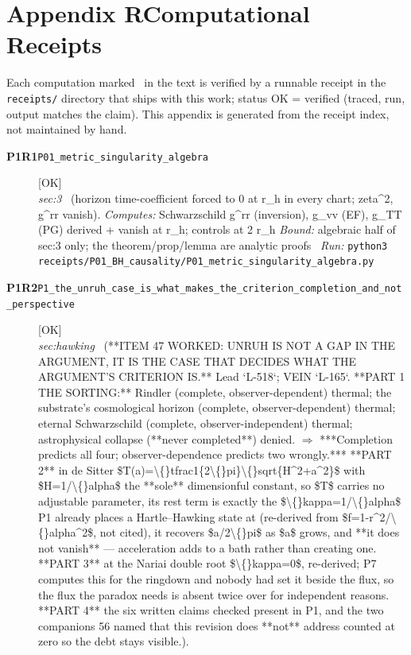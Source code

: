 \clearpage
\section*{Appendix R\quad Computational Receipts}\label{app:receipts}
\small\noindent Each computation marked \rcptmarker\ in the text is verified by a runnable receipt in the \texttt{receipts/} directory that ships with this work; status \textsf{OK} = verified (traced, run, output matches the claim). This appendix is generated from the receipt index, not maintained by hand.\par\medskip
\begingroup\renewcommand{\arraystretch}{1.25}
\begin{description}
\item[\textbf{P1R1}\quad\texttt{P01\_metric\_singularity\_algebra}]\hfill\textsf{[OK]}\\
\textit{sec:3} \ (horizon time-coefficient forced to 0 at r\_h in every chart; \textbar{}zeta\textbar{}\textasciicircum{}2, g\textasciicircum{}rr vanish). 
\emph{Computes:} Schwarzschild g\textasciicircum{}rr (inversion), g\_vv (EF), g\_TT (PG) derived + vanish at r\_h; controls at 2 r\_h
 \emph{Bound:} algebraic half of sec:3 only; the theorem/prop/lemma are analytic proofs
\ \emph{Run:} \texttt{python3 receipts/P01\_BH\_causality/P01\_metric\_singularity\_algebra.py}
\item[\textbf{P1R2}\quad\texttt{P1\_the\_unruh\_case\_is\_what\_makes\_the\_criterion\_completion\_and\_not\_perspective}]\hfill\textsf{[OK]}\\
\textit{sec:hawking} \ (**ITEM 47 WORKED: UNRUH IS NOT A GAP IN THE ARGUMENT, IT IS THE CASE THAT DECIDES WHAT THE ARGUMENT'S CRITERION IS.** Lead `L-518`; VEIN `L-165`. **PART 1 THE SORTING:** Rindler (complete, observer-dependent) thermal; the substrate's cosmological horizon (complete, observer-dependent) thermal; eternal Schwarzschild (complete, observer-independent) thermal; astrophysical collapse (**never completed**) denied. \ensuremath{\Rightarrow} ***Completion predicts all four; observer-dependence predicts two wrongly.*** **PART 2** in de Sitter \$T(a)=\textbackslash\{\}tfrac1\{2\textbackslash\{\}pi\}\textbackslash\{\}sqrt\{H\textasciicircum{}2+a\textasciicircum{}2\}\$ with \$H=1/\textbackslash\{\}alpha\$ the **sole** dimensionful constant, so \$T\$ carries no adjustable parameter, its rest term is exactly the \$\textbackslash\{\}kappa=1/\textbackslash\{\}alpha\$ P1 already places a Hartle--Hawking state at (re-derived from \$f=1-r\textasciicircum{}2/\textbackslash\{\}alpha\textasciicircum{}2\$, not cited), it recovers \$a/2\textbackslash\{\}pi\$ as \$a\$ grows, and **it does not vanish** --- acceleration adds to a bath rather than creating one. **PART 3** at the Nariai double root \$\textbackslash\{\}kappa=0\$, re-derived; P7 computes this for the ringdown and nobody had set it beside the flux, so the flux the paradox needs is absent twice over for independent reasons. **PART 4** the six written claims checked present in P1, and the two companions 56 named that this revision does **not** address counted at zero so the debt stays visible.). 

\end{description}
